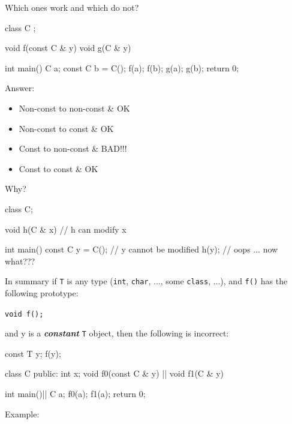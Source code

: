 Which ones work and which do not?

\begin{consolethree}[escapeinside=||]
class C {};

void f(const C & y) {}
void g(C & y) {}

int main()
{
    C a;
    const C b = C();
    f(a);
    f(b);
    g(a);
    g(b);
    return 0;
}
\end{consolethree}

Answer:

\begin{itemize}
\item Non-const to non-const \&     OK
\item Non-const to const \&         OK
\item Const to non-const \&         BAD!!!
\item Const to const \&             OK
\end{itemize}

Why?

\begin{consolethree}[escapeinside=||]
class C{};

void h(C & x) {} // h can modify x

int main()
{
    const C y = C(); // y cannot be modified
    h(y); // oops ... now what???
}
\end{consolethree}

In summary if \texttt{T} is any type (\texttt{int}, \texttt{char}, ...,
some \texttt{class}, ...), and \texttt{f()} has the following prototype:

\texttt{void f();}

and y is a \textbf{\textit{constant}} \texttt{T} object, then the following
is incorrect:

\begin{consolethree}[escapeinside=||]
const T y;
f(y);
\end{consolethree}

\begin{consolethree}[escapeinside=||]
class C {public: int x};
void f0(const C & y) {}||
void f1(C & y) {}

int main()||
{
    C a;
    f0(a); f1(a);
    return 0;
}
\end{consolethree}
Example:

